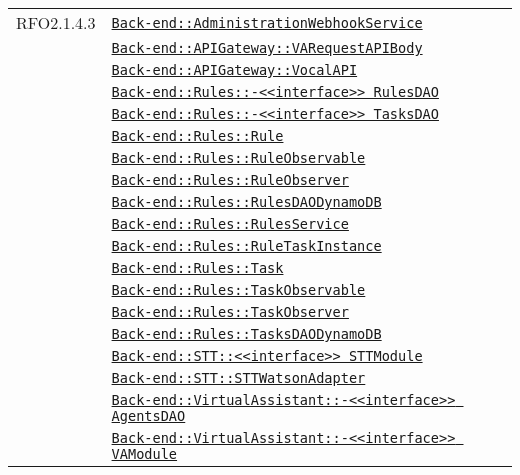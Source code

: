 \begin{longtable}{|>{\centering}m{3cm}|m{10cm}<{\centering}|}
RFO2.1.4.3 & \hyperref[Back-end::AdministrationWebhookService]{\texttt{Back-end::AdministrationWebhookService}}\\
& \hyperref[Back-end::APIGateway::VARequestAPIBody]{\texttt{Back-end::APIGateway::VARequestAPIBody}}\\
& \hyperref[Back-end::APIGateway::VocalAPI]{\texttt{Back-end::APIGateway::VocalAPI}}\\
& \hyperref[Back-end::Rules::<<interface>> RulesDAO]{\texttt{Back-end::Rules::-\linebreak <<interface>> RulesDAO}}\\
& \hyperref[Back-end::Rules::<<interface>> TasksDAO]{\texttt{Back-end::Rules::-\linebreak <<interface>> TasksDAO}}\\
& \hyperref[Back-end::Rules::Rule]{\texttt{Back-end::Rules::Rule}}\\
& \hyperref[Back-end::Rules::RuleObservable]{\texttt{Back-end::Rules::RuleObservable}}\\
& \hyperref[Back-end::Rules::RuleObserver]{\texttt{Back-end::Rules::RuleObserver}}\\
& \hyperref[Back-end::Rules::RulesDAODynamoDB]{\texttt{Back-end::Rules::RulesDAODynamoDB}}\\
& \hyperref[Back-end::Rules::RulesService]{\texttt{Back-end::Rules::RulesService}}\\
& \hyperref[Back-end::Rules::RuleTaskInstance]{\texttt{Back-end::Rules::RuleTaskInstance}}\\
& \hyperref[Back-end::Rules::Task]{\texttt{Back-end::Rules::Task}}\\
& \hyperref[Back-end::Rules::TaskObservable]{\texttt{Back-end::Rules::TaskObservable}}\\
& \hyperref[Back-end::Rules::TaskObserver]{\texttt{Back-end::Rules::TaskObserver}}\\
& \hyperref[Back-end::Rules::TasksDAODynamoDB]{\texttt{Back-end::Rules::TasksDAODynamoDB}}\\
& \hyperref[Back-end::STT::<<interface>> STTModule]{\texttt{Back-end::STT::<<interface>> STTModule}}\\
& \hyperref[Back-end::STT::STTWatsonAdapter]{\texttt{Back-end::STT::STTWatsonAdapter}}\\
& \hyperref[Back-end::VirtualAssistant::<<interface>> AgentsDAO]{\texttt{Back-end::VirtualAssistant::-\linebreak <<interface>> AgentsDAO}}\\
& \hyperref[Back-end::VirtualAssistant::<<interface>> VAModule]{\texttt{Back-end::VirtualAssistant::-\linebreak <<interface>> VAModule}}\\

\end{longtable}
